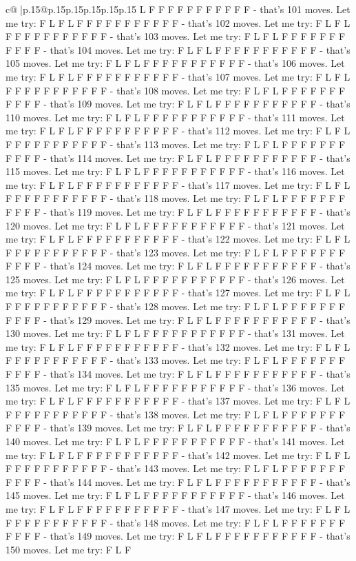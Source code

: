 \documentclass{article}
\begin{document}
{\begin{supertabular}{c@{$\;$}|p{.15\linewidth}@{}p{.15\linewidth}p{.15\linewidth}p{.15\linewidth}p{.15\linewidth}p{.15\linewidth}}
{{{L F F F F F F F F F F F {-} that's 101 moves. Let me try: F L F L F F F F F F F F F F F {-} that's 102 moves. Let me try: F L F L F F F F F F F F F F F {-} that's 103 moves. Let me try: F L F L F F F F F F F F F F F {-} that's 104 moves. Let me try: F L F L F F F F F F F F F F F {-} that's 105 moves. Let me try: F L F L F F F F F F F F F F F {-} that's 106 moves. Let me try: F L F L F F F F F F F F F F F {-} that's 107 moves. Let me try: F L F L F F F F F F F F F F F {-} that's 108 moves. Let me try: F L F L F F F F F F F F F F F {-} that's 109 moves. Let me try: F L F L F F F F F F F F F F F {-} that's 110 moves. Let me try: F L F L F F F F F F F F F F F {-} that's 111 moves. Let me try: F L F L F F F F F F F F F F F {-} that's 112 moves. Let me try: F L F L F F F F F F F F F F F {-} that's 113 moves. Let me try: F L F L F F F F F F F F F F F {-} that's 114 moves. Let me try: F L F L F F F F F F F F F F F {-} that's 115 moves. Let me try: F L F L F F F F F F F F F F F {-} that's 116 moves. Let me try: F L F L F F F F F F F F F F F {-} that's 117 moves. Let me try: F L F L F F F F F F F F F F F {-} that's 118 moves. Let me try: F L F L F F F F F F F F F F F {-} that's 119 moves. Let me try: F L F L F F F F F F F F F F F {-} that's 120 moves. Let me try: F L F L F F F F F F F F F F F {-} that's 121 moves. Let me try: F L F L F F F F F F F F F F F {-} that's 122 moves. Let me try: F L F L F F F F F F F F F F F {-} that's 123 moves. Let me try: F L F L F F F F F F F F F F F {-} that's 124 moves. Let me try: F L F L F F F F F F F F F F F {-} that's 125 moves. Let me try: F L F L F F F F F F F F F F F {-} that's 126 moves. Let me try: F L F L F F F F F F F F F F F {-} that's 127 moves. Let me try: F L F L F F F F F F F F F F F {-} that's 128 moves. Let me try: F L F L F F F F F F F F F F F {-} that's 129 moves. Let me try: F L F L F F F F F F F F F F F {-} that's 130 moves. Let me try: F L F L F F F F F F F F F F F {-} that's 131 moves. Let me try: F L F L F F F F F F F F F F F {-} that's 132 moves. Let me try: F L F L F F F F F F F F F F F {-} that's 133 moves. Let me try: F L F L F F F F F F F F F F F {-} that's 134 moves. Let me try: F L F L F F F F F F F F F F F {-} that's 135 moves. Let me try: F L F L F F F F F F F F F F F {-} that's 136 moves. Let me try: F L F L F F F F F F F F F F F {-} that's 137 moves. Let me try: F L F L F F F F F F F F F F F {-} that's 138 moves. Let me try: F L F L F F F F F F F F F F F {-} that's 139 moves. Let me try: F L F L F F F F F F F F F F F {-} that's 140 moves. Let me try: F L F L F F F F F F F F F F F {-} that's 141 moves. Let me try: F L F L F F F F F F F F F F F {-} that's 142 moves. Let me try: F L F L F F F F F F F F F F F {-} that's 143 moves. Let me try: F L F L F F F F F F F F F F F {-} that's 144 moves. Let me try: F L F L F F F F F F F F F F F {-} that's 145 moves. Let me try: F L F L F F F F F F F F F F F {-} that's 146 moves. Let me try: F L F L F F F F F F F F F F F {-} that's 147 moves. Let me try: F L F L F F F F F F F F F F F {-} that's 148 moves. Let me try: F L F L F F F F F F F F F F F {-} that's 149 moves. Let me try: F L F L F F F F F F F F F F F {-} that's 150 moves. Let me try: F L F }}}
\end{supertabular}}
\end{document}
